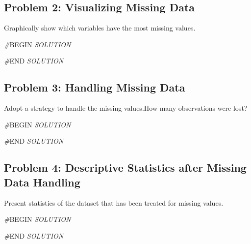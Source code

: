 \documentclass[
]{article}
\newenvironment{Shaded}{\begin{snugshade}}{\end{snugshade}}
\newcommand{\CommentTok}[1]{\textcolor[rgb]{0.56,0.35,0.01}{\textit{#1}}}
\newcommand{\RegionMarkerTok}[1]{#1}
\begin{document}
\hypertarget{problem-2-visualizing-missing-data}{%
\subsection{Problem 2: Visualizing Missing
Data}\label{problem-2-visualizing-missing-data}}

Graphically show which variables have the most missing values.

\begin{Shaded}
\begin{Highlighting}[]
\CommentTok{\#}\RegionMarkerTok{BEGIN}\CommentTok{ SOLUTION}

\CommentTok{\#}\RegionMarkerTok{END}\CommentTok{ SOLUTION}
\end{Highlighting}
\end{Shaded}

\hypertarget{problem-3-handling-missing-data}{%
\subsection{Problem 3: Handling Missing
Data}\label{problem-3-handling-missing-data}}

Adopt a strategy to handle the missing values.How many observations were
lost?

\begin{Shaded}
\begin{Highlighting}[]
\CommentTok{\#}\RegionMarkerTok{BEGIN}\CommentTok{ SOLUTION}

\CommentTok{\#}\RegionMarkerTok{END}\CommentTok{ SOLUTION}
\end{Highlighting}
\end{Shaded}

\hypertarget{problem-4-descriptive-statistics-after-missing-data-handling}{%
\subsection{Problem 4: Descriptive Statistics after Missing Data
Handling}\label{problem-4-descriptive-statistics-after-missing-data-handling}}

Present statistics of the dataset that has been treated for missing
values.

\begin{Shaded}
\begin{Highlighting}[]
\CommentTok{\#}\RegionMarkerTok{BEGIN}\CommentTok{ SOLUTION}

\CommentTok{\#}\RegionMarkerTok{END}\CommentTok{ SOLUTION}
\end{Highlighting}
\end{Shaded}
\end{document}
